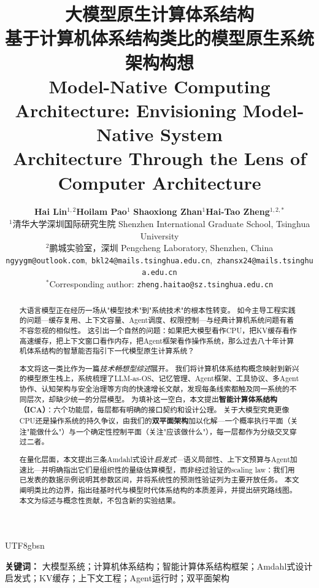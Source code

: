 \documentclass[11pt,a4paper]{article}
\title{\textbf{大模型原生计算体系结构}\\[6pt]
\large 基于计算机体系结构类比的模型原生系统架构构想\\[4pt]
\normalsize Model-Native Computing Architecture: Envisioning Model-Native System\\
Architecture Through the Lens of Computer Architecture}
\author{
\textbf{Hai Lin}$^{1,2}$\quad \textbf{Hoilam Pao}$^{1}$\quad
\textbf{Shaoxiong Zhan}$^{1}$\quad \textbf{Hai-Tao Zheng}$^{1,2,*}$\\[6pt]
$^{1}$清华大学深圳国际研究生院 \quad Shenzhen International Graduate School, Tsinghua University\\
$^{2}$鹏城实验室，深圳 \quad Pengcheng Laboratory, Shenzhen, China\\[4pt]
\texttt{ngyygm@outlook.com},\ \texttt{bkl24@mails.tsinghua.edu.cn},\ \texttt{zhansx24@mails.tsinghua.edu.cn}\\
$^{*}$Corresponding author: \texttt{zheng.haitao@sz.tsinghua.edu.cn}
}
\begin{document}
\begin{CJK*}{UTF8}{gbsn}
\maketitle

\begin{abstract}
大语言模型正在经历一场从"模型技术"到"系统技术"的根本性转变。
如今主导工程实践的问题---缓存复用、上下文容量、Agent调度、权限控制---与经典计算机系统问题有着不容忽视的相似性。
这引出一个自然的问题：如果把大模型看作CPU，把KV缓存看作高速缓存，把上下文窗口看作内存，把Agent框架看作操作系统，那么过去八十年计算机体系结构的智慧能否指引下一代模型原生计算系统？

本文将这一类比作为一篇\emph{技术畅想型综述}展开。
我们将计算机体系结构概念映射到新兴的模型原生栈上，系统梳理了LLM-as-OS、记忆管理、Agent框架、工具协议、多Agent协作、认知架构与安全治理等方向的快速增长文献，发现每条线索都触及同一系统的不同层次，却缺少统一的分层模型。
为填补这一空白，本文提出\textbf{智能计算体系结构（ICA）}：六个功能层，每层都有明确的接口契约和设计公理。
关于大模型究竟更像CPU还是操作系统的持久争议，由我们的\textbf{双平面架构}加以化解---一个概率执行平面（关注"能做什么"）与一个确定性控制平面（关注"应该做什么"），每一层都作为分级交叉穿过二者。

在量化层面，本文提出三条Amdahl式设计\emph{启发式}---语义局部性、上下文预算与Agent加速比---并明确指出它们是组织性的量级估算模型，而非经过验证的scaling law：我们用已发表的数据示例说明其参数区间，并将系统性的预测性验证列为主要开放任务。
本文阐明类比的边界，指出硅基时代与模型时代体系结构的本质差异，并提出研究路线图。
本文为综述与概念性贡献，不包含新的实验结果。
\end{abstract}

\textbf{关键词：} 大模型系统；计算机体系结构；智能计算体系结构框架；Amdahl式设计启发式；KV缓存；上下文工程；Agent运行时；双平面架构













\end{CJK*}
\end{document}
